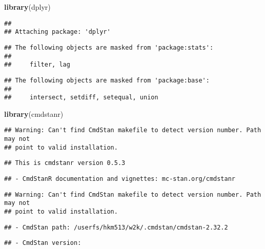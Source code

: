 \documentclass[
]{article}
\author{}
\date{\vspace{-2.5em}}
\newenvironment{Shaded}{\begin{snugshade}}{\end{snugshade}}
\newcommand{\FunctionTok}[1]{\textcolor[rgb]{0.13,0.29,0.53}{\textbf{#1}}}
\newcommand{\NormalTok}[1]{#1}
\begin{document}
\begin{Shaded}
\begin{Highlighting}[]
\FunctionTok{library}\NormalTok{(dplyr)}
\end{Highlighting}
\end{Shaded}

\begin{verbatim}
## 
## Attaching package: 'dplyr'
\end{verbatim}

\begin{verbatim}
## The following objects are masked from 'package:stats':
## 
##     filter, lag
\end{verbatim}

\begin{verbatim}
## The following objects are masked from 'package:base':
## 
##     intersect, setdiff, setequal, union
\end{verbatim}

\begin{Shaded}
\begin{Highlighting}[]
\FunctionTok{library}\NormalTok{(cmdstanr)}
\end{Highlighting}
\end{Shaded}

\begin{verbatim}
## Warning: Can't find CmdStan makefile to detect version number. Path may not
## point to valid installation.
\end{verbatim}

\begin{verbatim}
## This is cmdstanr version 0.5.3
\end{verbatim}

\begin{verbatim}
## - CmdStanR documentation and vignettes: mc-stan.org/cmdstanr
\end{verbatim}

\begin{verbatim}
## Warning: Can't find CmdStan makefile to detect version number. Path may not
## point to valid installation.
\end{verbatim}

\begin{verbatim}
## - CmdStan path: /userfs/hkm513/w2k/.cmdstan/cmdstan-2.32.2
\end{verbatim}

\begin{verbatim}
## - CmdStan version:
\end{verbatim}
\end{document}
